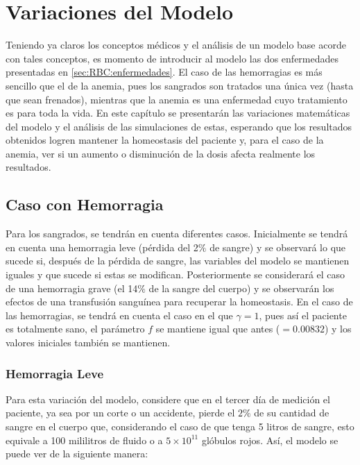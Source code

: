 \chapter{Variaciones del Modelo}\label{chap:variaciones}

Teniendo ya claros los conceptos médicos y el análisis de un modelo base acorde con tales conceptos, es momento de introducir al modelo las dos enfermedades presentadas en \ref{sec:RBC:enfermedades}. El caso de las hemorragias es más sencillo que el de la anemia, pues los sangrados son tratados una única vez (hasta que sean frenados), mientras que la anemia es una enfermedad cuyo tratamiento es para toda la vida. En este capítulo se presentarán las variaciones matemáticas del modelo y el análisis de las simulaciones de estas, esperando que los resultados obtenidos logren mantener la homeostasis del paciente y, para el caso de la anemia, ver si un aumento o disminución de la dosis afecta realmente los resultados.

\section{Caso con Hemorragia}\label{Sec:variaciones:hemorragia}

Para los sangrados, se tendrán en cuenta diferentes casos. Inicialmente se tendrá en cuenta una hemorragia leve (pérdida del 2$\%$ de sangre) y se observará lo que sucede si, después de la pérdida de sangre, las variables del modelo se mantienen iguales y que sucede si estas se modifican. Posteriormente se considerará el caso de una hemorragia grave (el 14$\%$ de la sangre del cuerpo) y se observarán los efectos de una transfusión sanguínea para recuperar la homeostasis. En el caso de las hemorragias, se tendrá en cuenta el caso en el que $\gamma =1$, pues así el paciente es totalmente sano, el parámetro $f$ se mantiene igual que antes ($=0.00832$) y los valores iniciales también se mantienen.

\subsection{Hemorragia Leve}\label{subsec:variaciones:hemorragia:leve}

Para esta variación del modelo, considere que en el tercer día de medición el paciente, ya sea por un corte o un accidente, pierde el $2\%$ de su cantidad de sangre en el cuerpo que, considerando el caso de que tenga 5 litros de sangre, esto equivale a 100 mililitros de fluido o a $5\times 10^{11}$ glóbulos rojos. Así, el modelo se puede ver de la siguiente manera:

